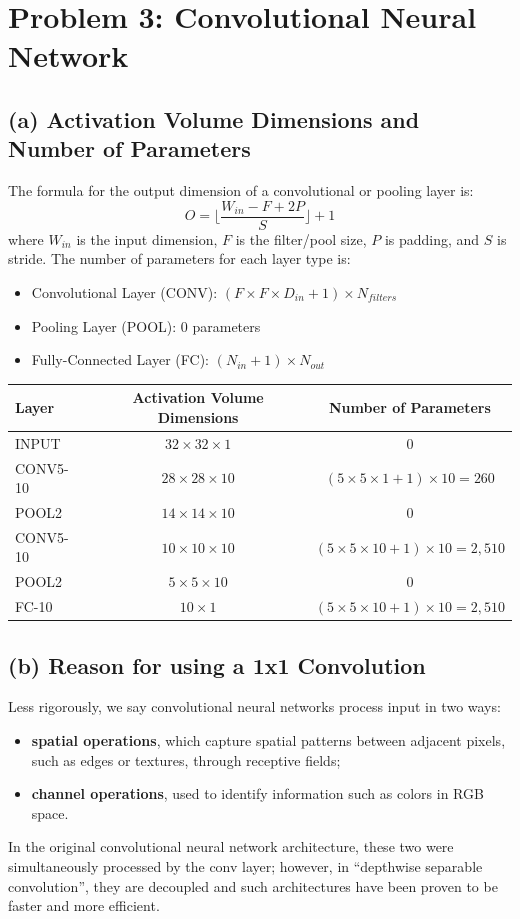 \documentclass[11pt, a4paper, oneside]{memoir}
\begin{document}
\chapter{Problem 3: Convolutional Neural Network}
\section*{(a) Activation Volume Dimensions and Number of Parameters}
The formula for the output dimension of a convolutional or pooling layer is:
\[ O = \lfloor \frac{W_{in} - F + 2P}{S} \rfloor + 1 \]
where $W_{in}$ is the input dimension, $F$ is the filter/pool size, $P$ is padding, and $S$ is stride.
The number of parameters for each layer type is:
\begin{itemize}
    \item Convolutional Layer (CONV): $(F \times F \times D_{in} + 1) \times N_{filters}$
    \item Pooling Layer (POOL): 0 parameters
    \item Fully-Connected Layer (FC): $(N_{in} + 1) \times N_{out}$
\end{itemize}

\begin{table}[H]
\centering
\begin{tabular}{lcc}
\toprule
Layer & Activation Volume Dimensions & Number of Parameters \\
\midrule
INPUT & $32 \times 32 \times 1$ & 0 \\
CONV5-10 & $28 \times 28 \times 10$ & $(5 \times 5 \times 1 + 1) \times 10 = 260$ \\
POOL2 & $14 \times 14 \times 10$ & 0 \\
CONV5-10 & $10 \times 10 \times 10$ & $(5 \times 5 \times 10 + 1) \times 10 = 2,510$ \\
POOL2 & $5 \times 5 \times 10$ & 0 \\
FC-10 & $10 \times 1$ & $(5 \times 5 \times 10 + 1) \times 10 = 2,510$ \\
\bottomrule
\end{tabular}
\end{table}

\section*{(b) Reason for using a 1x1 Convolution}
Less rigorously, we say convolutional neural networks process input in two ways:
\begin{itemize}
    \item \textbf{spatial operations}, which capture spatial patterns between adjacent pixels, such as edges or textures, through receptive fields;
    \item \textbf{channel operations}, used to identify information such as colors in RGB space.
\end{itemize}
In the original convolutional neural network architecture, these two were simultaneously processed by the conv layer;
however, in ``depthwise separable convolution'', they are decoupled and such architectures have been proven to be faster and more efficient.
\end{document}
